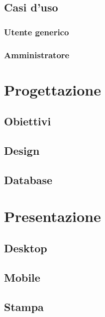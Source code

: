 \documentclass[a4paper, dvipsnames, table]{article}
\begin{document}
	\subsection{Casi d'uso}
		\subsubsection{Utente generico}
			
		\subsubsection{Amministratore}
			

\newpage
\section{Progettazione}%
	\subsection{Obiettivi}
		
	\subsection{Design}%
		
	\subsection{Database}
		

\newpage
\section{Presentazione}%
	\subsection{Desktop}
		
	\subsection{Mobile}
		
	\subsection{Stampa}
		
\end{document}
